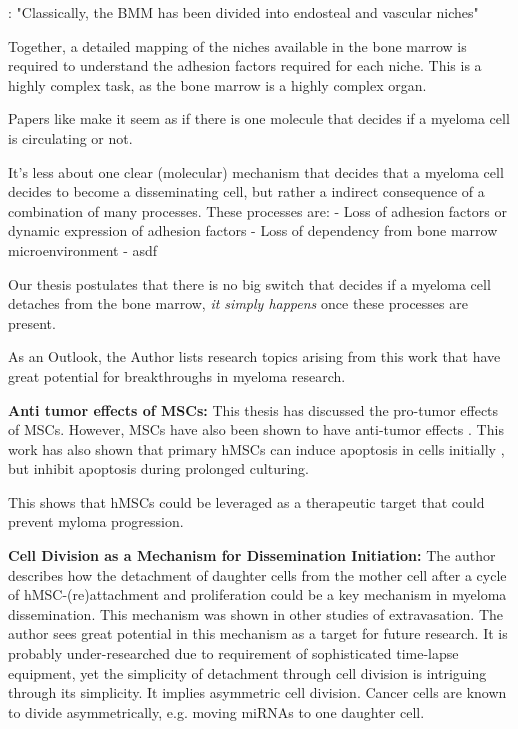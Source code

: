 \citet{bouzerdanAdhesionMoleculesMultiple2022}: "Classically, the BMM has been
divided into endosteal and vascular niches"

Together, a detailed mapping of the niches available in the bone marrow is required
to understand the adhesion factors required for each niche. This is a highly
complex task, as the bone marrow is a highly complex organ.

%
\label{sec:discussion_many_small_switches}%

Papers like \citet{akhmetzyanovaDynamicCD138Surface2020} make it seem as if
there is one molecule that decides if a myeloma cell is circulating or not.

It's less about one clear (molecular) mechanism that decides that a myeloma cell
decides to become a disseminating cell, but rather a indirect consequence of a combination of many
processes.
These processes are:
- Loss of adhesion factors or dynamic expression of adhesion factors
- Loss of dependency from bone marrow microenvironment
- asdf

Our thesis postulates that there is no big switch that decides if a myeloma cell
detaches from the bone marrow, \emph{it simply happens} once these processes are
present.


\label{sec:discussion_potential_breakthroughs}
As an Outlook, the Author lists research topics arising from this work that have
great potential for breakthroughs in myeloma research.

\textbf{Anti tumor effects of MSCs:}
This thesis has discussed the pro-tumor effects of MSCs. However, MSCs have also
been shown to have anti-tumor effects \cite{galderisiMyelomaCellsCan2015}. This
work has also shown that primary \acp{hMSC} can induce apoptosis in  cells
initially ,
but inhibit apoptosis during prolonged culturing.

This shows that hMSCs could be leveraged
as a therapeutic target that could prevent myloma progression.




\textbf{Cell Division as a Mechanism for Dissemination Initiation:}
The author describes how the detachment of daughter cells from the mother cell
after a cycle of hMSC-(re)attachment and proliferation could be a key mechanism
in myeloma dissemination. This mechanism was shown in other studies of
extravasation. The author sees great potential in this mechanism as a target for
future research. It is probably under-researched due to requirement of
sophisticated time-lapse equipment, yet the simplicity of detachment through
cell division is intriguing through its simplicity. It implies asymmetric cell
division. Cancer cells are known to divide asymmetrically, e.g. moving miRNAs to
one daughter cell.

